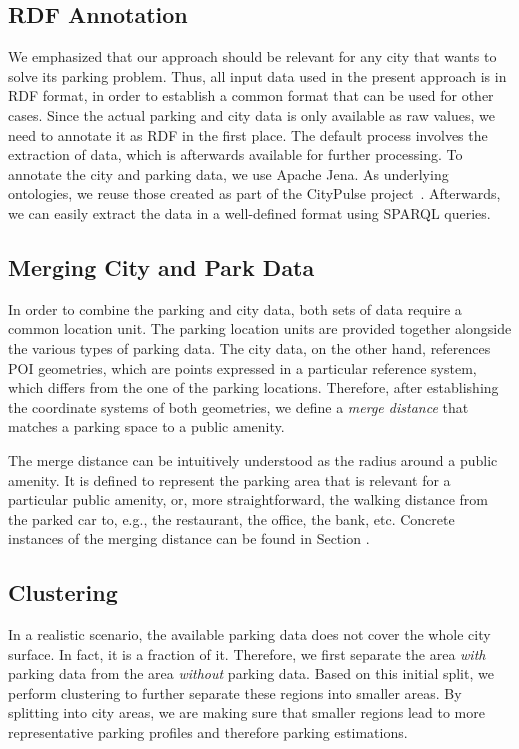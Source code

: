 \subsection{RDF Annotation}
We emphasized that our approach should be relevant for any city that wants to solve its parking problem. Thus, all input data used in the present approach is in RDF format, in order to establish a common format that can be used for other cases.
Since the actual parking and city data is only available as raw values, we need to annotate it as RDF in the first place.
The default process involves the extraction of data, which is afterwards available for further processing. To annotate the city and parking data, we use Apache Jena. As underlying ontologies, we reuse those created as part of the CityPulse project~\cite{city_pulse}. Afterwards, we can easily extract the data in a well-defined format using SPARQL queries. 

\subsection{Merging City and Park Data}
In order to combine the parking and city data, both sets of data require a common location unit. 
The parking location units are provided together alongside the various types of parking data. 
The city data, on the other hand, references POI geometries, which are points expressed in a particular reference system, which differs from the one of the parking locations.
Therefore, after establishing the coordinate systems of both geometries, we define a \textit{merge distance} that matches a parking space to a public amenity. 

The merge distance can be intuitively understood as the radius around a public amenity. It is defined to represent the parking area that is relevant for a particular public amenity, or, more straightforward, the walking distance from the parked car to, e.g., the restaurant, the office, the bank, etc. Concrete instances of the merging distance can be found in Section .

\subsection{Clustering}
\label{concept:clustering}
In a realistic scenario, the available parking data does not cover the whole city surface. In fact, it is a fraction of it. Therefore, we first separate the area \textit{with} parking data from the area \textit{without} parking data. Based on this initial split, we perform clustering to further separate these regions into smaller areas. By splitting into city areas, we are making sure that smaller regions lead to more representative parking profiles and therefore parking estimations. 


